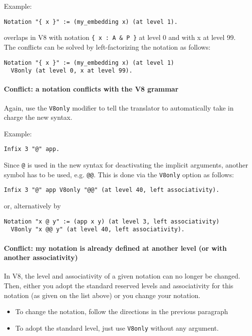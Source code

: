 \documentclass[11pt,a4paper]{article}
\begin{document}
Example:
\begin{verbatim}
Notation "{ x }" := (my_embedding x) (at level 1).
\end{verbatim}
overlaps in V8 with notation \verb#{ x : A & P }# at level 0 and with
x at level 99. The conflicts can be solved by left-factorizing the
notation as follows:
\begin{verbatim}
Notation "{ x }" := (my_embedding x) (at level 1)
  V8only (at level 0, x at level 99).
\end{verbatim}

\paragraph{Conflict: a notation conflicts with the V8 grammar}

Again, use the {\tt V8only} modifier to tell the translator to
automatically take in charge the new syntax.

Example:
\begin{verbatim}
Infix 3 "@" app.
\end{verbatim}
Since {\tt @} is used in the new syntax for deactivating the implicit
arguments, another symbol has to be used, e.g. {\tt @@}. This is done via
the {\tt V8only} option as follows:
\begin{verbatim}
Infix 3 "@" app V8only "@@" (at level 40, left associativity).
\end{verbatim}
or, alternatively by
\begin{verbatim}
Notation "x @ y" := (app x y) (at level 3, left associativity)
  V8only "x @@ y" (at level 40, left associativity).
\end{verbatim}

\paragraph{Conflict: my notation is already defined at another level
  (or with another associativity)}

In V8, the level and associativity of a given notation can no longer
be changed. Then, either you adopt the standard reserved levels and
associativity for this notation (as given on the list above) or you
change your notation.
\begin{itemize}
\item To change the notation, follow the directions in the previous
paragraph
\item To adopt the standard level, just use {\tt V8only} without any
argument.
\end{itemize}
\end{document}
